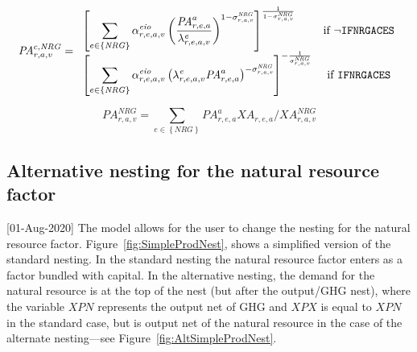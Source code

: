 \documentclass[11pt,letterpaper]{report}
\begin{document}
\begin{equation}
\label{eq:panrgc}
\mathit{PA}^{c,\mathit{NRG}}_{r,a,v} =
\begin{array}{l c l}
   \left[
      \displaystyle
            \sum_{e \in \left\{ \mathit{NRG} \right\}} {
               \alpha^{\mathit{eio}}_{r,e,a,v}
               \left( \frac {\mathit{PA}^a_{r,e,a}} {\lambda^{\mathit{e}}_{r,e,a,v}}
               \right)^{1 - \sigma^{\mathit{NRG}}_{\mathit{r,a,v}}}
            }
         \right]^{\frac{1} {1 - \sigma^{\mathit{NRG}}_{\mathit{r,a,v}}}} &
	\textrm{if } \lnot \texttt{IFNRGACES} \\
   \left[\displaystyle
         \sum_{e \in \left\{ \mathit{NRG} \right\}} {
            \alpha^{\mathit{eio}}_{r,e,a,v}
            \left( {\lambda^{\mathit{e}}_{r,e,a,v}} {\mathit{PA}^a_{r,e,a}}
            \right)^{- \sigma^{\mathit{NRG}}_{\mathit{r,a,v}}}
         }
      \right]^{-\frac{1} {\sigma^{\mathit{NRG}}_{\mathit{r,a,v}}}} &
	\textrm{if } \texttt{IFNRGACES} \\
\end{array}
\end{equation}

\begin{equation}
\label{eq:panrg}
\mathit{PA}^{\mathit{NRG}}_{r,a,v} =
   \displaystyle \sum_{e \in \left\{ \mathit{NRG} \right\}} { \mathit{PA}^a_{r,e,a} \mathit{XA}_{r,e,a}}
   \bigg / \mathit{XA}^{\mathit{NRG}}_{r,a,v}
\end{equation}

\subsection{Alternative nesting for the natural resource factor}

[01-Aug-2020] The model allows for the user to change the
nesting for the natural resource factor. Figure~\ref{fig:SimpleProdNest}, shows a simplified version
of the standard nesting. In the standard nesting the natural resource
factor enters as a factor bundled with capital. In the alternative
nesting, the demand for the natural resource is at the top of the nest
(but after the output/GHG nest), where the variable $\mathit{XPN}$
represents the output net of GHG and $\mathit{XPX}$ is equal to
$\mathit{XPN}$ in the standard case, but is output net of the natural
resource in the case of the alternate nesting---see Figure~\ref{fig:AltSimpleProdNest}.
\end{document}
